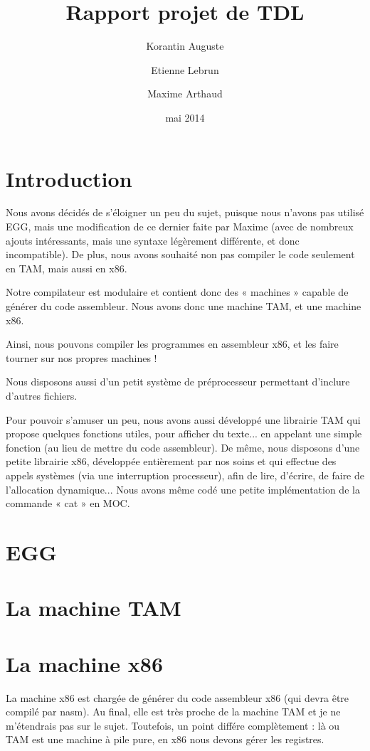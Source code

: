 \documentclass{scrartcl}
\title{Rapport projet de TDL}
\author{Korantin Auguste \and Etienne Lebrun \and Maxime Arthaud}
\date{mai 2014}
\begin{document}
  \maketitle
  \tableofcontents
  \newpage

\section{Introduction}
    Nous avons décidés de s'éloigner un peu du sujet, puisque nous
    n'avons pas utilisé EGG, mais une modification de ce dernier faite
    par Maxime (avec de nombreux ajouts intéressants, mais une syntaxe
    légèrement différente, et donc incompatible).
    De plus, nous avons souhaité non pas compiler le code seulement en TAM,
    mais aussi en x86.

    Notre compilateur est modulaire et contient donc des « machines » capable de générer du code
    assembleur. Nous avons donc une machine TAM, et une machine x86.

    Ainsi, nous pouvons compiler les programmes en assembleur x86, et les faire tourner sur nos
    propres machines !

    Nous disposons aussi d'un petit système de préprocesseur permettant d'inclure d'autres fichiers.
    
    Pour pouvoir s'amuser un peu, nous avons aussi développé une librairie TAM qui propose quelques
    fonctions utiles, pour afficher du texte... en appelant une simple fonction (au lieu de mettre
    du code assembleur).
    De même, nous disposons d'une petite librairie x86, développée entièrement par nos soins et qui
    effectue des appels systèmes (via une interruption processeur), afin de lire, d'écrire, de faire
    de l'allocation dynamique... Nous avons même codé une petite implémentation de la commande « cat »
    en MOC.
 
\section{EGG}

\section{La machine TAM}

\section{La machine x86}

La machine x86 est chargée de générer du code assembleur x86 (qui devra être compilé par nasm).
Au final, elle est très proche de la machine TAM et je ne m'étendrais pas sur le sujet.
Toutefois, un point différe complètement : là ou TAM est une machine à pile pure, en x86 nous
devons gérer les registres.
\end{document}
